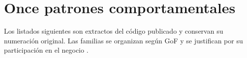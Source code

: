 \section{Once patrones comportamentales}
Los listados siguientes son extractos del código publicado y conservan su numeración original. Las familias se organizan según GoF y se justifican por su participación en el negocio \cite{gof}.













